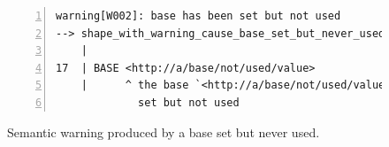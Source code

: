 \begin{figure}
\begin{lstlisting}[numbers=left,basicstyle=\ttfamily\scriptsize]
warning[W002]: base has been set but not used
--> shape_with_warning_cause_base_set_but_never_used.shex:17:5
    |
17  | BASE <http://a/base/not/used/value>
    |      ^ the base `<http://a/base/not/used/value>` definition is
             set but not used
    \end{lstlisting}
    \caption[Semantic warning produced by a base set but never used]{Semantic warning produced by a base set but never used.}
    \label{fig:warn-base-not-used}
\end{figure}